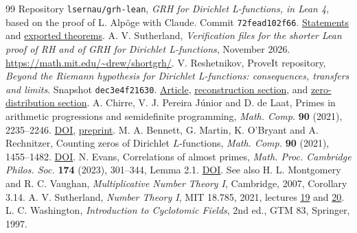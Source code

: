 \documentclass[11pt]{article}
\begin{document}
\begin{thebibliography}{99}\small
{} Repository \texttt{lsernau/grh-lean}, \emph{GRH for Dirichlet L-functions, in Lean 4}, based on the proof of L. Alp\"oge with Claude. Commit \texttt{72fead102f66}. \href{https://github.com/lsernau/grh-lean/blob/72fead102f663d5c7a407964a13dc0cf9d977207/grh/src/Statements.lean}{Statements} and \href{https://github.com/lsernau/grh-lean/blob/72fead102f663d5c7a407964a13dc0cf9d977207/grh/src/Main.lean}{exported theorems}.
 A. V. Sutherland, \emph{Verification files for the shorter Lean proof of RH and of GRH for Dirichlet L-functions}, November 2026. \url{https://math.mit.edu/~drew/shortgrh/}.
 V. Reshetnikov, ProveIt repository, \emph{Beyond the Riemann hypothesis for Dirichlet L-functions: consequences, transfers and limits}. Snapshot \texttt{dec3e4f21630}. \href{https://github.com/VladimirReshetnikov/ProveIt/tree/dec3e4f216305071186a1cc4c42fe1cdb38df9be/Analysis/GeneralizedRiemannHypothesis/Article}{Article}, \href{https://github.com/VladimirReshetnikov/ProveIt/blob/dec3e4f216305071186a1cc4c42fe1cdb38df9be/Analysis/GeneralizedRiemannHypothesis/Article/sections/rec.tex}{reconstruction section}, and \href{https://github.com/VladimirReshetnikov/ProveIt/blob/dec3e4f216305071186a1cc4c42fe1cdb38df9be/Analysis/GeneralizedRiemannHypothesis/Article/sections/zer.tex}{zero-distribution section}.
 A. Chirre, V. J. Pereira J\'unior and D. de Laat, Primes in arithmetic progressions and semidefinite programming, \emph{Math. Comp.} \textbf{90} (2021), 2235--2246. \href{https://doi.org/10.1090/mcom/3638}{DOI}, \href{https://arxiv.org/abs/2005.02393}{preprint}.
 M. A. Bennett, G. Martin, K. O'Bryant and A. Rechnitzer, Counting zeros of Dirichlet \(L\)-functions, \emph{Math. Comp.} \textbf{90} (2021), 1455--1482. \href{https://doi.org/10.1090/mcom/3599}{DOI}.
 N. Evans, Correlations of almost primes, \emph{Math. Proc. Cambridge Philos. Soc.} \textbf{174} (2023), 301--344, Lemma 2.1. \href{https://doi.org/10.1017/S0305004122000251}{DOI}. See also H. L. Montgomery and R. C. Vaughan, \emph{Multiplicative Number Theory I}, Cambridge, 2007, Corollary 3.14.
 A. V. Sutherland, \emph{Number Theory I}, MIT 18.785, 2021, lectures \href{https://ocw.mit.edu/courses/18-785-number-theory-i-fall-2021/mit18_785f21_lec19.pdf}{19} and \href{https://ocw.mit.edu/courses/18-785-number-theory-i-fall-2021/mit18_785f21_lec20.pdf}{20}.
 L. C. Washington, \emph{Introduction to Cyclotomic Fields}, 2nd ed., GTM 83, Springer, 1997.

\end{thebibliography}
\end{document}
